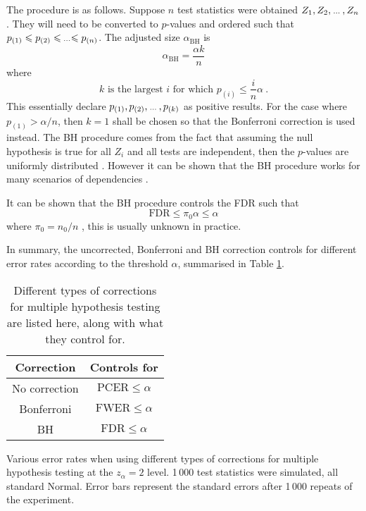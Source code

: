 The procedure is as follows. Suppose $n$ test statistics were obtained $Z_1,Z_2,\dotdotdot,Z_n$. They will need to be converted to $p$-values and ordered such that $p_{(1)}\leqslant p_{(2)}\leqslant \dotdotdot \leqslant p_{(n)}$. The adjusted size $\alpha_{\text{BH}}$ is
\begin{equation}
    \alpha_{\text{BH}} = \frac{\alpha k}{n}
\end{equation}
where
\begin{equation}
    k\text{ is the largest }i\text{ for which }p_{(i)}\leqslant\frac{i}{n}\alpha
    \ .
\end{equation}
This essentially declare $p_{(1)},p_{(2)},\dotdotdot,p_{(k)}$ as positive results. For the case where $p_{(1)}>\alpha/n$, then $k=1$ shall be chosen so that the Bonferroni correction is used instead. The BH procedure comes from the fact that assuming the null hypothesis is true for all $Z_i$ and all tests are independent, then the $p$-values are uniformly distributed \citep{simes1986improved}. However it can be shown that the BH procedure works for many scenarios of dependencies \citep{benjamini2001control}. 

It can be shown that the BH procedure controls the FDR such that
\begin{equation}
    \text{FDR}\leqslant\pi_0\alpha\leqslant\alpha
\end{equation}
where $\pi_0=n_0/n$ \citep{benjamini1995controlling}, this is usually unknown in practice.

In summary, the uncorrected, Bonferroni and BH correction controls for different error rates according to the threshold $\alpha$, summarised in Table \ref{table:inference_corrections}.

\begin{table}
    \centering
    \begin{tabular}{c|c}
        Correction&Controls for\\\hline
        No correction&$\text{PCER}\leqslant\alpha$\\
        Bonferroni&$\text{FWER}\leqslant\alpha$\\
        BH&$\text{FDR}\leqslant\alpha$
    \end{tabular}
    \caption{Different types of corrections for multiple hypothesis testing are listed here, along with what they control for.}
    \label{table:inference_corrections}
\end{table}

\begin{table}
    \centering
    
    \caption{Various error rates when using different types of corrections for multiple hypothesis testing at the $z_\alpha=2$ level. 1\,000 test statistics were simulated, all standard Normal. Error bars represent the standard errors after 1\,000 repeats of the experiment.}
\end{table}

